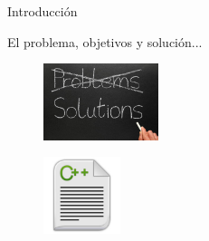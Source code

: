 \documentclass[10pt]{beamer}
\begin{document}
\begin{frame}{Introducción}{}
\begin{block}{}
	 El problema, objetivos y solución...
\begin{figure}[!h]
 \begin{flushleft}
\includegraphics[width=0.3\textwidth]{./AAUgraphics/problem2.jpg}
\end{flushleft}
\end{figure}

\begin{figure}[!h]
 \begin{flushright}
 \includegraphics[width=0.2\textwidth]{./AAUgraphics/cfile.jpg}
 \end{flushright}
\end{figure}

\end{block}
\end{frame}

%  
%  
%  
\end{document}
